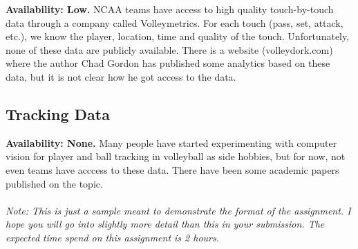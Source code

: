 \documentclass{article}
\begin{document}
        {\bf Availability: Low.} NCAA teams have access to high quality touch-by-touch data through a company called Volleymetrics. For each touch (pass, set, attack, etc.), we know the player, location, time and quality of the touch. Unfortunately, none of these data are publicly available. There is a website (volleydork.com) where the author Chad Gordon has published some analytics based on these data, but it is not clear how he got access to the data.

      \subsection*{Tracking Data}

        {\bf Availability: None.} Many people have started experimenting with computer vision for player and ball tracking in volleyball as side hobbies, but for now, not even teams have acccess to these data. There have been some academic papers published on the topic.\\
~\\
{\it Note: This is just a sample meant to demonstrate the format of the assignment. I hope you will go into slightly more detail than this in your submission. The expected time spend on this assignment is 2 hours.}
    
\end{document}
